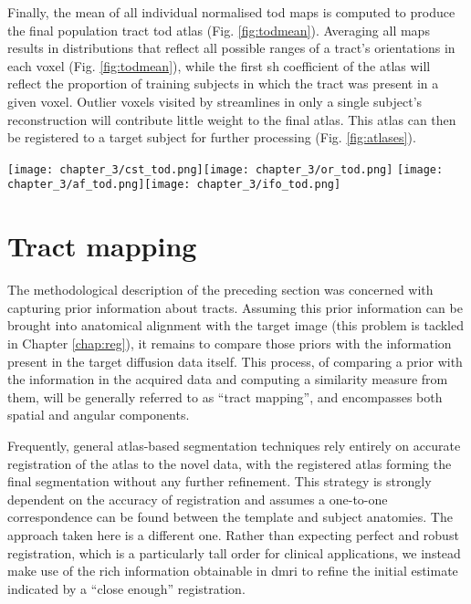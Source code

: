 \documentclass[12pt,phd,a4paper,twoside]{ucl_thesis}
\renewcommand{\textcite}[2][]{
\ifthenelse { \equal {#1} {} }  {\citeauthor{#2}\autocite{#2}}   {\citeauthor{#1}\autocite{#2}}}
\begin{document}
Finally, the mean of all individual normalised \gls{tod} maps is computed to produce the final population tract \gls{tod} atlas (Fig. \ref{fig:todmean}).
Averaging all maps results in distributions that reflect all possible ranges of a tract's orientations in each voxel (Fig. \ref{fig:todmean}), while the first \gls{sh} coefficient of the atlas will reflect the proportion of training subjects in which the tract was present in a given voxel.
Outlier voxels visited by streamlines in only a single subject's reconstruction will contribute little weight to the final atlas.
This atlas can then be registered to a target subject for further processing (Fig. \ref{fig:atlases}).



\begin{figure*}[htb!]
  \centering
    \texttt{[image: chapter\_3/cst\_tod.png]}\texttt{[image: chapter\_3/or\_tod.png]}
    \texttt{[image: chapter\_3/af\_tod.png]}\texttt{[image: chapter\_3/ifo\_tod.png]}
  \caption[Tract orientation atlases for the CST, AF, OR and IFOF]{Tract orientation atlases, composite images projected onto coronal (CST), axial (OR, IFOF) and sagittal (AF) views in MNI152 reference space. Reproduced from \textcite{Young2024}}\label{fig:atlases}
\end{figure*}
\clearpage{}
\clearpage{}\section{Tract mapping}
\label{sec:mapping}

The methodological description of the preceding section was concerned with capturing prior information about tracts.
Assuming this prior information can be brought into anatomical alignment with the target image (this problem is tackled in Chapter \ref{chap:reg}), it remains to compare those priors with the information present in the target diffusion data itself.
This process, of comparing a prior with the information in the acquired data and computing a similarity measure from them, will be generally referred to as ``tract mapping'', and encompasses both spatial and angular components.

Frequently, general atlas-based segmentation techniques rely entirely on accurate registration of the atlas to the novel data, with the registered atlas forming the final segmentation without any further refinement.
This strategy is strongly dependent on the accuracy of registration and assumes a one-to-one correspondence can be found between the template and subject anatomies.
The approach taken here is a different one.
Rather than expecting perfect and robust registration, which is a particularly tall order for clinical applications, we instead make use of the rich information obtainable in \gls{dmri} to refine the initial estimate indicated by a ``close enough'' registration.
\end{document}
